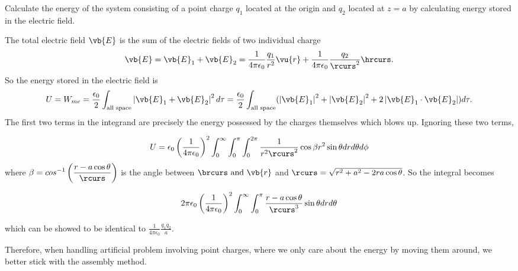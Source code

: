\documentclass[english,a4paper,12pt]{report}
\begin{document}
{Calculate the energy of the system consisting of a point charge \(q_1\) located at the origin and \(q_2\) located at \( z=a \) by calculating energy stored in the electric field.}
{The total electric field \(\vb{E} \) is the sum of the electric fields of two individual charge
\begin{equation}
    \vb{E} = \vb{E} _{1} + \vb{E} _{2} = \frac{1}{4\pi\epsilon_0} \frac{q_1}{r^2} \vu{r} + \frac{1}{4\pi\epsilon_0} \frac{q_2}{\rcurs ^2} \hrcurs. 
\end{equation}
So the energy stored in the electric field is
\begin{equation}
    U = W_{me} = \frac{\epsilon_0}{2} \int _{\text{all space} } \left| \vb{E} _{1} + \vb{E} _{2}  \right| ^2 d\tau = \frac{\epsilon_0}{2} \int _{\text{all space} } (\left| \vb{E} _{1}  \right| ^2 + \left| \vb{E} _{2}  \right| ^2 + 2\left| \vb{E} _{1} \cdot \vb{E} _{2}  \right|) d\tau .
\end{equation}
The first two terms in the integrand are precisely the energy possessed by the charges themselves which blows up. Ignoring these two terms,

\begin{equation}
    U = \epsilon_0 \left(\frac{1}{4\pi\epsilon_0} \right)^2 \int_{0}^{\infty} \int_{0}^{\pi } \int_{0}^{2\pi }     \frac{1}{r^2\rcurs ^2} \cos \beta r^2\sin \theta drd\theta d\phi 
\end{equation}
where \(\displaystyle \beta = cos^{-1} \left(\frac{r-a \cos \theta }{\rcurs }\right)\) is the angle between \(\brcurs \text{ and } \vb{r}\) and \(\rcurs = \sqrt{r^2 + a^2 -2ra\cos \theta } \). So the integral becomes

\begin{equation}
    2\pi \epsilon_0 \left(\frac{1}{4\pi\epsilon_0} \right)^2 \int_{0}^{\infty} \int_{0}^{\pi } \frac{r-a \cos \theta }{\rcurs ^3} \sin \theta drd\theta  
\end{equation}

which can be showed to be identical to \(\displaystyle \frac{1}{4\pi\epsilon_0} \frac{q_1q_2}{a} \).

Therefore, when handling artificial problem involving point charges, where we only care about the energy by moving them around, we better stick with the assembly method.} 
\end{document}
